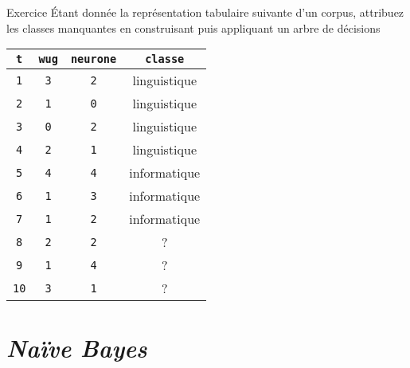 \documentclass[hyperref={unicode}, xcolor={svgnames}, french]{beamer}
\title{\titlepagetitle}
\subtitle{\titlepagesubtitle}
\author{\textbf{\myname} (\mylab)}
\institute{}
\date{\tiny Version {\yyyymmdddate\today}T\currenttime}
\begin{document}

\begin{frame}[plain]
	\titlepage
\end{frame}

\begin{frame}[fragile=singleslide]{Exercice}
	Étant donnée la représentation tabulaire suivante d'un corpus, attribuez les classes manquantes en construisant puis appliquant un arbre de décisions
	\begin{table}
		\begin{tabu} to .9
			\texttt{t}  & \texttt{wug} & \texttt{neurone} & \texttt{classe}\\
			\hline
			\texttt{1}  & \texttt{3}      & \texttt{2}	& linguistique\\
			\texttt{2}  & \texttt{1}      & \texttt{0}	& linguistique\\
			\texttt{3}  & \texttt{0}      & \texttt{2}	& linguistique\\
			\texttt{4}  & \texttt{2}      & \texttt{1}	& linguistique\\
			\texttt{5}  & \texttt{4}      & \texttt{4}	& informatique\\
			\texttt{6}  & \texttt{1}      & \texttt{3}	& informatique\\
			\texttt{7}  & \texttt{1}      & \texttt{2}	& informatique\\
			\texttt{8}  & \texttt{2}      & \texttt{2}	& ?\\
			\texttt{9}  & \texttt{1}      & \texttt{4}	& ?\\
			\texttt{10}  & \texttt{3}      & \texttt{1}	& ?\\
		\end{tabu}
	\end{table}
\end{frame}

%

\section{\emph{Naïve Bayes}}
\end{document}
